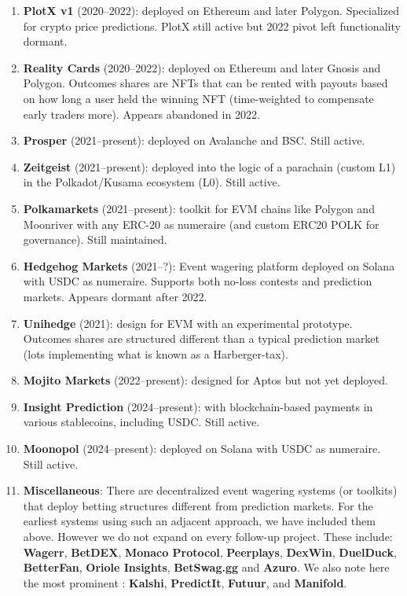 \begin{enumerate}
\item \textbf{PlotX v1} (2020--2022): \depm deployed on Ethereum and later Polygon. Specialized for crypto price predictions. PlotX still active but 2022 pivot left \depm functionality dormant. 

\item \textbf{Reality Cards} (2020--2022): \depm deployed on Ethereum and later Gnosis and Polygon. Outcomes shares are NFTs that can be rented with payouts based on how long a user held the winning NFT (time-weighted to compensate early traders more). Appears abandoned in 2022.

\item \textbf{Prosper} (2021--present): \depm deployed on Avalanche and BSC. Still active.

\item \textbf{Zeitgeist} (2021--present): \depm deployed into the logic of a parachain (custom L1) in the Polkadot/Kusama ecosystem (L0). Still active.

\item \textbf{Polkamarkets} (2021--present): \depm toolkit for EVM chains like Polygon and Moonriver with any ERC-20 as numeraire (and custom ERC20 POLK for governance). Still maintained.

\item \textbf{Hedgehog Markets} (2021--?): Event wagering platform deployed on Solana with USDC as numeraire. Supports both no-loss contests and prediction markets. Appears dormant after 2022.

\item \textbf{Unihedge} (2021): \depm design for EVM with an experimental prototype. Outcomes shares are structured different than a typical prediction market (lots implementing what is known as a Harberger-tax).

\item \textbf{Mojito Markets} (2022--present): \depm designed for Aptos but not yet deployed.

\item \textbf{Insight Prediction} (2024--present): \cepm with blockchain-based payments in various stablecoins, including USDC. Still active.

\item \textbf{Moonopol} (2024--present): \depm deployed on Solana with USDC as numeraire. Still active.

\item \textbf{Miscellaneous}: There are decentralized event wagering systems (or toolkits) that deploy betting structures different from prediction markets. For the earliest systems using such an adjacent approach, we have included them above. However we do not expand on every follow-up project. These include: \textbf{Wagerr}, \textbf{BetDEX}, \textbf{Monaco Protocol}, \textbf{Peerplays}, \textbf{DexWin}, \textbf{DuelDuck}, \textbf{BetterFan}, \textbf{Oriole Insights}, \textbf{BetSwag.gg} and \textbf{Azuro}. We also note here the most prominent \cepms: \textbf{Kalshi}, \textbf{PredictIt}, \textbf{Futuur}, and \textbf{Manifold}. 

\end{enumerate}
